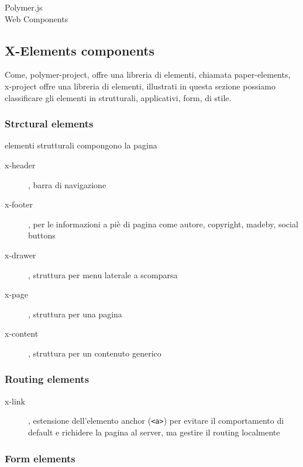 \documentclass{sig-alternate}
\begin{document}
\begin{description}
       \item[Polymer.js]
       \item[Web Components] 
\end{description}


\subsection{X-Elements components}

Come, polymer-project, offre una libreria di elementi, chiamata paper-elements, 
x-project offre una libreria di elementi, illustrati in questa sezione
possiamo classificare gli elementi in  strutturali, applicativi, form, di stile.



\subsubsection{Strctural elements}

elementi strutturali compongono la pagina

\begin{description}
       \item[x-header], barra di navigazione
       \item[x-footer], per le informazioni a piè di pagina come autore, copyright, madeby, social buttons
       \item[x-drawer], struttura per menu laterale a scomparsa
       \item[x-page], struttura per una pagina
       \item[x-content], struttura per un contenuto generico
\end{description}





\subsubsection{Routing elements}

\begin{description}
      \item[x-link], estensione dell’elemento anchor ({\tt <a>}) per evitare il comportamento di default e richidere la pagina al server, ma gestire il routing localmente 
\end{description}


\subsubsection{Form elements}
\end{document}
